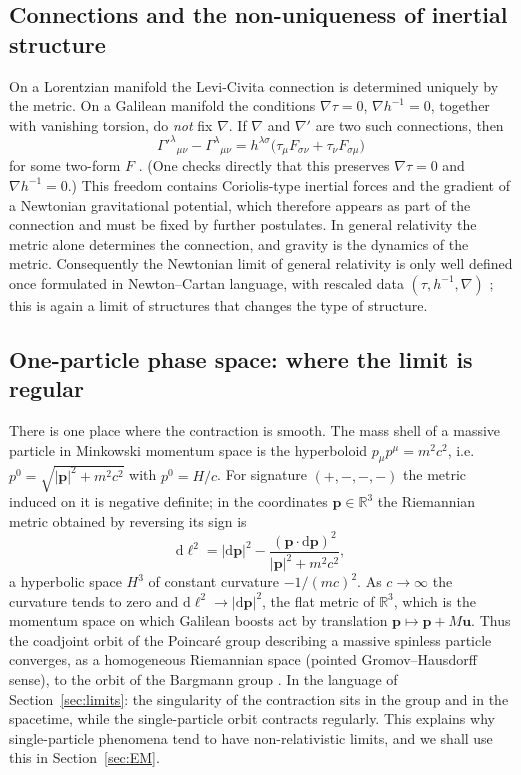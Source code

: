 \documentclass[11pt,a4paper]{article}
\newcommand{\dd}{\mathrm{d}}
\newcommand{\R}{\mathbb{R}}
\newcommand{\bp}{\mathbf{p}}
\newcommand{\bu}{\mathbf{u}}
\theoremstyle{plain}
\theoremstyle{definition}
\theoremstyle{remark}
\begin{document}
\subsection{Connections and the non-uniqueness of inertial structure}
On a Lorentzian manifold the Levi-Civita connection is determined uniquely by the metric. On a
Galilean manifold the conditions $\nabla\tau=0$, $\nabla h^{-1}=0$, together with vanishing torsion,
do \emph{not} fix $\nabla$. If $\nabla$ and $\nabla'$ are two such connections, then
\begin{equation}
\Gamma'^{\lambda}{}_{\mu\nu}-\Gamma^{\lambda}{}_{\mu\nu}
=h^{\lambda\sigma}\bigl(\tau_\mu F_{\sigma\nu}+\tau_\nu F_{\sigma\mu}\bigr)
\end{equation}
for some two-form $F$ \cite{Kunzle72,DBKP85}. (One checks directly that this preserves $\nabla\tau=0$ and $\nabla h^{-1}=0$.)
This freedom contains Coriolis-type inertial forces and the gradient of a Newtonian gravitational
potential, which therefore appears as part of the connection and must be fixed by further
postulates. In general relativity the metric alone determines the connection, and gravity is the
dynamics of the metric. Consequently the Newtonian limit of general relativity is only well
defined once formulated in Newton--Cartan language, with rescaled data $(\tau,h^{-1},\nabla)$
\cite{Kunzle72,DBKP85,Ehlers97}; this is again a limit of structures that changes the type of
structure.

\subsection{One-particle phase space: where the limit is regular}
There is one place where the contraction is smooth. The mass shell of a massive particle in
Minkowski momentum space is the hyperboloid $p_\mu p^\mu=m^2c^2$, i.e.\ $p^0=\sqrt{|\bp|^2+m^2c^2}$ with $p^0=H/c$. For
signature $(+,-,-,-)$ the metric induced on it is negative definite; in the coordinates
$\bp\in\R^3$ the Riemannian metric obtained by reversing its sign is
\begin{equation}
\dd\ell^2=|\dd\bp|^2-\frac{(\bp\cdot\dd\bp)^2}{|\bp|^2+m^2c^2},
\end{equation}
a hyperbolic space $H^3$ of constant curvature $-1/(mc)^2$. As $c\to\infty$ the curvature tends to
zero and $\dd\ell^2\to|\dd\bp|^2$, the flat metric of $\R^3$, which is the momentum space on which
Galilean boosts act by translation $\bp\mapsto\bp+M\bu$. Thus the coadjoint orbit of the Poincar\'e
group describing a massive spinless particle converges, as a homogeneous Riemannian space
(pointed Gromov--Hausdorff sense), to the orbit of the Bargmann group \cite{Souriau70}. In the
language of Section~\ref{sec:limits}: the singularity of the contraction sits in the group and in
the spacetime, while the single-particle orbit contracts regularly. This explains why single-particle
phenomena tend to have non-relativistic limits, and we shall use this in Section~\ref{sec:EM}.
\end{document}
